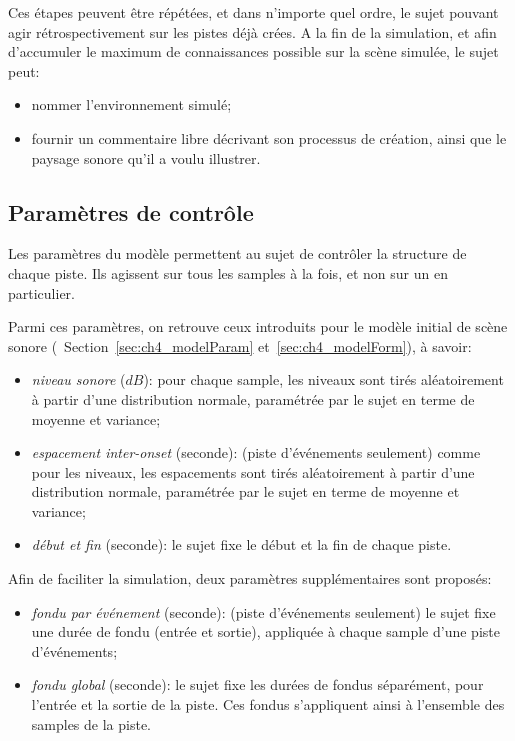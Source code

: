 Ces étapes peuvent être répétées, et dans n'importe quel ordre, le sujet pouvant agir rétrospectivement sur les pistes déjà crées. A la fin de la simulation, et afin d'accumuler le maximum de connaissances possible sur la scène simulée, le sujet peut: 

\begin{itemize}
\item nommer l'environnement simulé;
\item fournir un commentaire libre décrivant son processus de création, ainsi que le paysage sonore qu'il a voulu illustrer.
\end{itemize}

\subsection{Paramètres de contrôle}
\label{sec:ch4_param}

Les paramètres du modèle permettent au sujet de contrôler la structure de chaque piste. Ils agissent sur tous les samples à la fois, et non sur un en particulier.

Parmi ces paramètres, on retrouve ceux introduits pour le modèle initial de scène sonore (\cf~Section~\ref{sec:ch4_modelParam} et~\ref{sec:ch4_modelForm}), à savoir:

\begin{itemize}
\item \emph{niveau sonore} ($dB$): pour chaque sample, les niveaux sont tirés aléatoirement à partir d'une distribution normale, paramétrée par le sujet en terme de moyenne et variance;
\item \emph{espacement inter-onset} (seconde): (piste d'événements seulement) comme pour les niveaux, les espacements sont tirés aléatoirement à partir d'une distribution normale, paramétrée par le sujet en terme de moyenne et variance;
\item \emph{début et fin} (seconde): le sujet fixe le début et la fin de chaque piste.
\end{itemize}

Afin de faciliter la simulation, deux paramètres supplémentaires sont proposés:

\begin{itemize}
\item \emph{fondu par événement} (seconde): (piste d'événements seulement) le sujet fixe une durée de fondu (entrée et sortie), appliquée à chaque sample d'une piste d'événements;
\item \emph{fondu global} (seconde): le sujet fixe les durées de fondus séparément, pour l'entrée et la sortie de la piste. Ces fondus s'appliquent ainsi à l'ensemble des samples de la piste.
\end{itemize}


